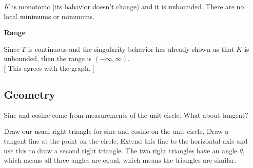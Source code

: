 \documentclass{ximera}
\begin{document}
$K$ is monotonic (its bahavior doesn't change) and it is unbounded.  There are no local minimums or minimums. 










\textbf{\textcolor{blue!55!black}{Range}}


Since $T$ is continuous and the singularity behavior has already shown us that $K$ is unbounded, then the range is $(-\infty, \infty)$. \\ 



[ This agrees with the graph. ]
























\subsection*{Geometry}


Sine and cosine come from measurements of the unit circle.  What about tangent?


Draw our usual right triangle for sine and cosine on the unit circle.  Draw a tangent line at the point on the circle.  Extend this line to the horizontal axis and use this to draw a second right triangle.  The two right triangles have an angle $\theta$, which means all three angles are equal, which means the triangles are similar.
\end{document}
